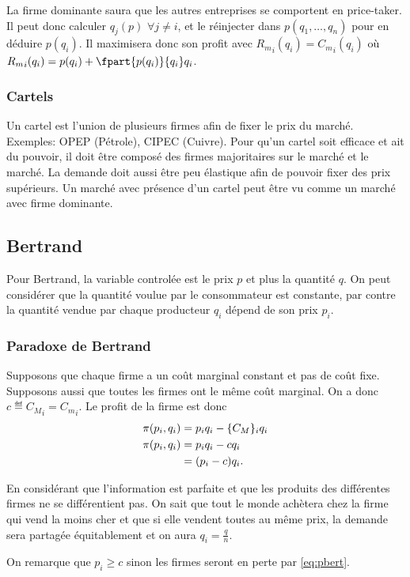 La firme dominante saura que les autres entreprises
se comportent en price-taker.
Il peut donc calculer $q_j(p)$ $\forall j \neq i$,
et le réinjecter dans $p(q_1,\ldots,q_n)$ pour en déduire $p(q_i)$.
Il maximisera donc son profit avec ${R_m}_i(q_i) = {C_m}_i(q_i)$
où ${R_m}_i(q_i) = p(q_i) + \fpart{p(q_i)}{q_i}q_i$.

\subsubsection{Cartels}
Un cartel est l'union de plusieurs firmes afin de fixer le prix du marché.
Exemples: OPEP (Pétrole), CIPEC (Cuivre).
Pour qu'un cartel soit efficace et ait du pouvoir, il doit être composé
des firmes majoritaires sur le marché et le marché. La demande doit aussi
être peu élastique afin de pouvoir fixer des prix supérieurs.
Un marché avec présence d'un cartel peut être vu comme un marché avec firme dominante.


\subsection{Bertrand}
Pour Bertrand, la variable controlée est le prix $p$ et plus la quantité $q$.
On peut considérer que la quantité voulue par le consommateur est constante,
par contre la quantité vendue par chaque producteur $q_i$ dépend
de son prix $p_i$.

\subsubsection{Paradoxe de Bertrand}
Supposons que chaque firme a un coût marginal constant et pas de coût fixe.
Supposons aussi que toutes les firmes ont le même coût marginal.
On a donc $c \eqdef {C_M}_i = {C_m}_i$.
Le profit de la firme est donc
\begin{align}
  \nonumber
  \pi(p_i,q_i) & = p_iq_i - \{C_M\}_iq_i\\
  \nonumber
  \pi(p_i,q_i) & = p_iq_i - cq_i\\
  \label{eq:pbert}
  & = (p_i-c)q_i.
\end{align}

En considérant que l'information est parfaite et que les produits
des différentes firmes ne se différentient pas.
On sait que tout le monde achètera chez la firme qui vend la moins cher
et que si elle vendent toutes au même prix,
la demande sera partagée équitablement et on aura $q_i = \frac{q}{n}$.

On remarque que $p_i \geq c$ sinon les firmes seront en perte
par \eqref{eq:pbert}.

